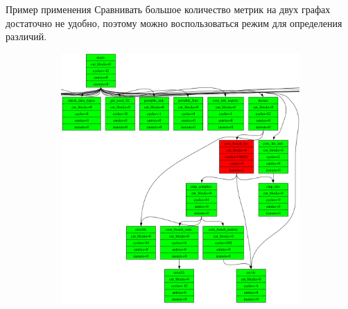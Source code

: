 \documentclass[10pt,aspectratio=169,hyperref={pdftex,unicode},xcolor=dvipsnames]{beamer}
\begin{document}
\begin{frame}{ Пример применения }
    Сравнивать большое количество метрик на двух графах достаточно
    не удобно, поэтому можно воспользоваться режим для определения различий.



    \begin{figure}
        \begin{subfigure}{0.45\textwidth}
            \centering
            \includegraphics[height=0.7\textheight,keepaspectratio]{./images/stac_diff.png}
        \end{subfigure}
        \begin{subfigure}{0.45\textwidth}
            \centering
\end{subfigure}
\end{figure}
\end{frame}
\end{document}
